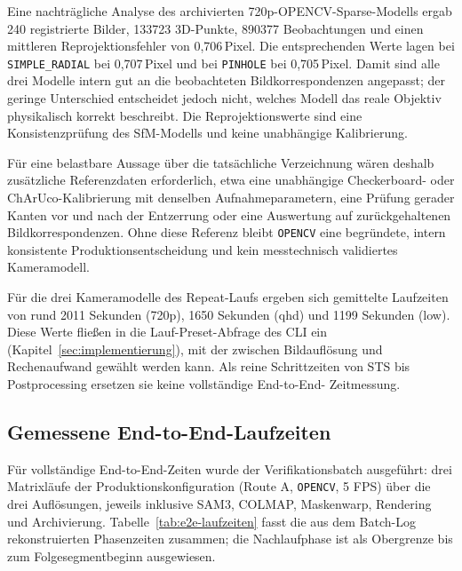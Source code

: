 Eine nachträgliche Analyse des archivierten 720p-OPENCV-Sparse-Modells ergab
240 registrierte Bilder, 133723 3D-Punkte, 890377 Beobachtungen und einen
mittleren Reprojektionsfehler von 0,706\,Pixel. Die entsprechenden Werte lagen
bei \texttt{SIMPLE\_RADIAL} bei 0,707\,Pixel und bei \texttt{PINHOLE} bei
0,705\,Pixel. Damit sind alle drei Modelle intern gut an die beobachteten
Bildkorrespondenzen angepasst; der geringe Unterschied entscheidet jedoch
nicht, welches Modell das reale Objektiv physikalisch korrekt beschreibt.
Die Reprojektionswerte sind eine Konsistenzprüfung des SfM-Modells und keine
unabhängige Kalibrierung.

Für eine belastbare Aussage über die tatsächliche Verzeichnung wären deshalb
zusätzliche Referenzdaten erforderlich, etwa eine unabhängige
Checkerboard- oder ChArUco-Kalibrierung mit denselben Aufnahmeparametern,
eine Prüfung gerader Kanten vor und nach der Entzerrung oder eine Auswertung
auf zurückgehaltenen Bildkorrespondenzen. Ohne diese Referenz bleibt
\texttt{OPENCV} eine begründete, intern konsistente Produktionsentscheidung
und kein messtechnisch validiertes Kameramodell.

Für die drei Kameramodelle des Repeat-Laufs ergeben sich gemittelte Laufzeiten
von rund 2011 Sekunden (720p), 1650 Sekunden (qhd) und 1199 Sekunden (low).
Diese Werte fließen in die Lauf-Preset-Abfrage
des CLI ein (Kapitel~\ref{sec:implementierung}), mit der zwischen
Bildauflösung und Rechenaufwand gewählt werden kann. Als reine Schrittzeiten
von STS bis Postprocessing ersetzen sie keine vollständige End-to-End-
Zeitmessung.

\subsection{Gemessene End-to-End-Laufzeiten}
\label{sec:laufzeiten-e2e}

Für vollständige End-to-End-Zeiten wurde der Verifikationsbatch
 ausgeführt: drei Matrixläufe der
Produktionskonfiguration (Route A, \texttt{OPENCV}, 5 FPS) über die drei
Auflösungen, jeweils inklusive SAM3, COLMAP, Maskenwarp, Rendering und
Archivierung. Tabelle~\ref{tab:e2e-laufzeiten} fasst die aus dem Batch-Log
rekonstruierten Phasenzeiten zusammen; die Nachlaufphase ist als Obergrenze bis
zum Folgesegmentbeginn ausgewiesen.

